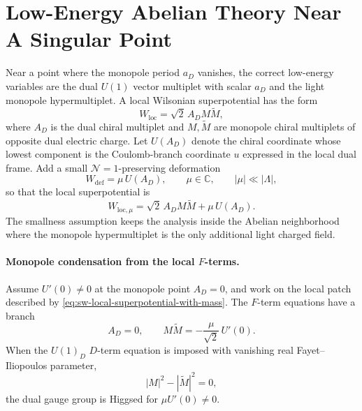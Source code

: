\section{Low-Energy Abelian Theory Near A Singular Point}
\label{sec:n2-low-energy-abelian-singular-point}

Near a point where the monopole period \(a_D\) vanishes, the correct
low-energy variables are the dual \(U(1)\) vector multiplet with scalar
\(a_D\) and the light monopole hypermultiplet.  A local Wilsonian
superpotential has the form
\[
  W_{\mathrm{loc}}=\sqrt2\,A_D M\widetilde M ,
\]
where \(A_D\) is the dual chiral multiplet and \(M,\widetilde M\) are monopole
chiral multiplets of opposite dual electric charge.  Let \(U(A_D)\) denote the
chiral coordinate whose lowest component is the Coulomb-branch coordinate
\(u\) expressed in the local dual frame.  Add a small
\(\mathcal N=1\)-preserving deformation
\begin{equation}
  W_{\mathrm{def}}=\mu\,U(A_D),
  \qquad
  \mu\in\mathbb C,\qquad |\mu|\ll |\Lambda|,
  \label{eq:sw-small-mass-deformation}
\end{equation}
so that the local superpotential is
\begin{equation}
  W_{\mathrm{loc},\mu}
  =
  \sqrt2\,A_D M\widetilde M+\mu\,U(A_D).
  \label{eq:sw-local-superpotential-with-mass}
\end{equation}
The smallness assumption keeps the analysis inside the Abelian neighborhood
where the monopole hypermultiplet is the only additional light charged
field.

\paragraph{\texorpdfstring{Monopole condensation from the local \(F\)-terms}{Monopole condensation from the local F-terms}.}
Assume \(U'(0)\neq0\) at the monopole point \(A_D=0\), and work on the local
patch described by \eqref{eq:sw-local-superpotential-with-mass}.  The
\(F\)-term equations have a branch
\begin{equation}
  A_D=0,\qquad
  M\widetilde M=-\frac{\mu}{\sqrt2}\,U'(0).
  \label{eq:sw-monopole-condensate-local}
\end{equation}
When the \(U(1)_D\) \(D\)-term equation is imposed with vanishing real
Fayet--Iliopoulos parameter,
\begin{equation}
  |M|^2-|\widetilde M|^2=0,
  \label{eq:sw-local-d-term}
\end{equation}
the dual gauge group is Higgsed for \(\mu U'(0)\neq0\).

